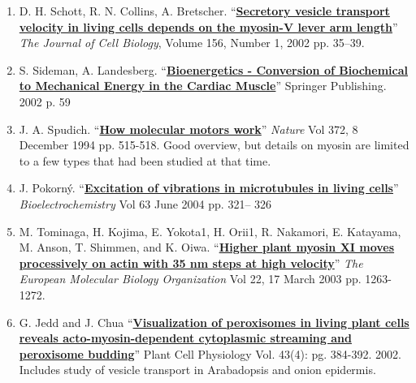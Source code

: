 \documentclass{../lab}
\begin{document}
\begin{enumerate}

    \item D. H. Schott, R. N. Collins, A. Bretscher. ``\href{https://drive.google.com/file/d/1r48stL8lABkYEo4yfWeEqsPkZXnWvo3E/view?usp=drive_link}{\textbf{Secretory vesicle transport velocity in living cells depends on the myosin-V lever arm length}}'' \emph{The Journal of Cell Biology}, Volume 156, Number 1, 2002 pp. 35–39.
    
    \item S. Sideman, A. Landesberg. ``\href{https://drive.google.com/file/d/1QCnAfBpYVISLKChrvnPxE827SM0yKrgL/view?usp=drive_link}{\textbf{Bioenergetics - Conversion of Biochemical to Mechanical Energy in the Cardiac Muscle}}'' Springer Publishing. 2002 p. 59

    \item J. A. Spudich. ``\href{https://drive.google.com/file/d/1QF2e4Sbn_Mq8pltlCvnzlffMNqojzXSJ/view?usp=drive_link}{\textbf{How molecular motors work}}'' \emph{Nature} Vol 372, 8 December 1994 pp. 515-518. Good overview, but details on myosin are limited to a few types that had been studied at that time. 

    \item J. Pokorný.
    ``\href{https://drive.google.com/file/d/1ZJe-OLX4lbhrBVt-R1KNOOmmtkhKQPdN/view?usp=drive_link}{\textbf{Excitation of vibrations in microtubules in living cells}}'' \emph{Bioelectrochemistry} Vol 63 June 2004 pp. 321– 326

    \item M. Tominaga, H. Kojima, E. Yokota1, H. Orii1, R. Nakamori, E. Katayama, M. Anson, T. Shimmen, and K. Oiwa. ``\href{https://drive.google.com/file/d/1vkC7zy5uBWCkZNA9udZRtJ1stMt0pxmv/view?usp=drive_link}{\textbf{Higher plant myosin XI moves processively on actin with 35 nm steps at high velocity}}'' \emph{The European Molecular Biology Organization} Vol 22, 17 March 2003 pp. 1263-1272. 

    \item G. Jedd and J. Chua
    ``\href{https://drive.google.com/file/d/1Z79C9-GEk4VwxVjWbfiIfj0062aSvaaG/view?usp=drive_link}{\textbf{Visualization of peroxisomes in living plant cells reveals acto-myosin-dependent cytoplasmic streaming and peroxisome budding}}'' Plant Cell Physiology Vol. 43(4): pg. 384-392. 2002. Includes study of vesicle transport in Arabadopsis and onion epidermis. 


\end{enumerate}
\end{document}
